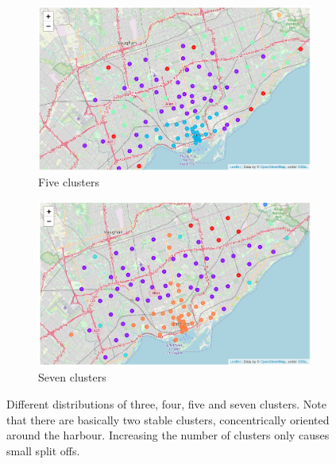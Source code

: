 \documentclass{article}
\begin{document}
\begin{figure}[ht]
\begin{subfigure}[b]{0.47\textwidth}
     \end{subfigure}
     \begin{subfigure}[b]{0.47\textwidth}
         \centering
         \includegraphics[width=\textwidth]{pics/clusters5}
         \caption{Five clusters}
     \end{subfigure}\hfill
     \begin{subfigure}[b]{0.47\textwidth}
         \centering
         \includegraphics[width=\textwidth]{pics/clusters7}
         \caption{Seven clusters}
     \end{subfigure}
     \caption{Different distributions of three, four, five and seven clusters. Note that there are basically two stable clusters, concentrically oriented around the harbour. Increasing the number of clusters only causes small split offs.}
        \label{fig:nbhclusters}
\end{figure}
\end{document}
